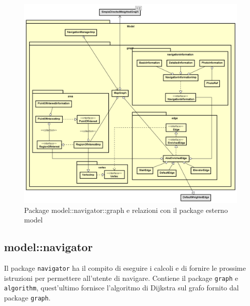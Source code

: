 \documentclass[../DefinizioneDiProdotto.tex,lanscape]{subfiles}
\begin{document}
\begin{figure}[h]
	\includegraphics[width=\textwidth]{img/RelationPackage/graph}
	\caption{Package model::navigator::graph e relazioni con il package esterno model}
	\label{graphPackage}
\end{figure}


\newpage
	
	\subsection{model::navigator}
		Il package \verb|navigator| ha il compito di eseguire i calcoli e di fornire le prossime istruzioni per permettere all'utente di navigare. Contiene il package \verb|graph| e \verb|algorithm|, quest'ultimo fornisce l'algoritmo di Dijkstra sul grafo fornito dal package \verb|graph|.
\end{document}
